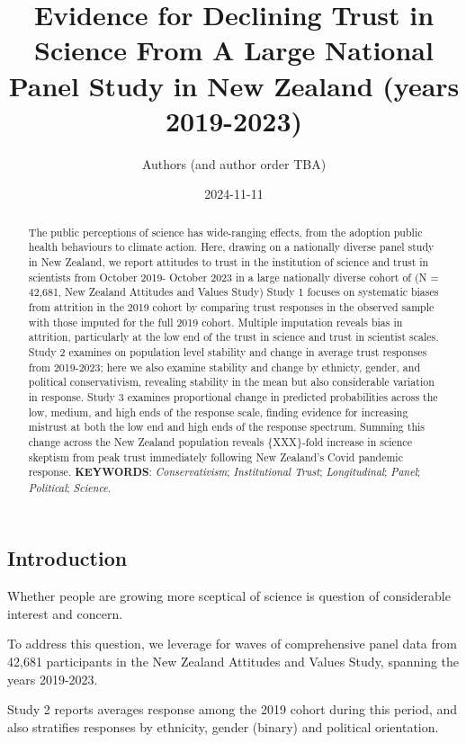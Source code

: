 \documentclass[
  single column]{article}
\title{Evidence for Declining Trust in Science From A Large National
Panel Study in New Zealand (years 2019-2023)}
\author{Authors (and author order TBA)}
\affil{%
             \small{     New Zealand
          ORCID \textcolor[HTML]{A6CE39}{\aiOrcid} ~0000-0003-3169-6576 }
              }
\date{2024-11-11}
\begin{document}
\maketitle
\begin{abstract}
The public perceptions of science has wide-ranging effects, from the
adoption public health behaviours to climate action. Here, drawing on a
nationally diverse panel study in New Zealand, we report attitudes to
trust in the institution of science and trust in scientists from October
2019- October 2023 in a large nationally diverse cohort of (N = 42,681,
New Zealand Attitudes and Values Study) Study 1 focuses on systematic
biases from attrition in the 2019 cohort by comparing trust responses in
the observed sample with those imputed for the full 2019 cohort.
Multiple imputation reveals bias in attrition, particularly at the low
end of the trust in science and trust in scientist scales. Study 2
examines on population level stability and change in average trust
responses from 2019-2023; here we also examine stability and change by
ethnicty, gender, and political conservativism, revealing stability in
the mean but also considerable variation in response. Study 3 examines
proportional change in predicted probabilities across the low, medium,
and high ends of the response scale, finding evidence for increasing
mistrust at both the low end and high ends of the response spectrum.
Summing this change across the New Zealand population reveals
\{XXX\}-fold increase in science skeptism from peak trust immediately
following New Zealand's Covid pandemic response. \textbf{KEYWORDS}:
\emph{Conservativism}; \emph{Institutional Trust}; \emph{Longitudinal};
\emph{Panel}; \emph{Political}; \emph{Science}.
\end{abstract}


\subsection{Introduction}\label{introduction}

Whether people are growing more sceptical of science is question of
considerable interest and concern.

To address this question, we leverage for waves of comprehensive panel
data from 42,681 participants in the New Zealand Attitudes and Values
Study, spanning the years 2019-2023.

Study 2 reports averages response among the 2019 cohort during this
period, and also stratifies responses by ethnicity, gender (binary) and
political orientation.
\end{document}

